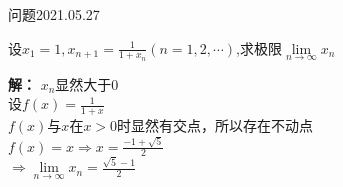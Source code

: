 \begin{mybox}{问题2021.05.27}
	
	\qquad 设$x_{1}=1,x_{n+1}=\frac{1}{1+x_{n}}(n=1,2,\cdots)$,求极限$\lim\limits_{n\to \infty} x_{n}$
\end{mybox}
\noindent
\textbf{解：}
$x_{n}$显然大于$0$\\
设$f(x)=\frac{1}{1+x}$\\
$f(x)$与$x$在$x>0$时显然有交点，所以存在不动点\\
$f(x)=x\Rightarrow x=\frac{-1+\sqrt{5}}{2}$\\
$\Rightarrow \lim\limits_{n\to \infty} x_{n}=\frac{\sqrt{5}-1}{2}$